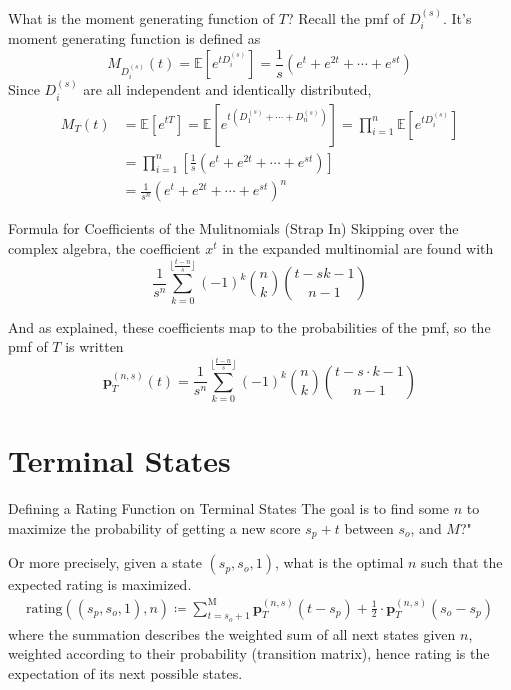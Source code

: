 \documentclass{beamer}
\begin{document}
\begin{frame}{What is the moment generating function of $T$?}
    Recall the pmf of $D_{i}^{(s)}$. It's moment generating function is defined as
    $$
    M_{D_{i}^{(s)}}(t) = \mathbb{E}[e^{tD_{i}^{(s)}}] = \frac{1}{s}(e^{t} + e^{2t} + \cdots + e^{st})
    $$
    Since $D_{i}^{(s)}$ are all independent and identically distributed,
    \begin{align*}
        M_{T}(t) &= \mathbb{E}[e^{tT}] = \mathbb{E}[e^{t(D_{1}^{(s)} + \cdots + D_{n}^{(s)})}] = \prod_{i = 1}^{n} \mathbb{E}[e^{tD_{i}^{(s)}}] \\
        &= \prod_{i = 1}^{n} \left[\frac{1}{s}(e^{t} + e^{2t} + \cdots + e^{st}) \right] \\
        &= \frac{1}{s^n} (e^{t} + e^{2t} + \cdots + e^{st})^n
    \end{align*}
\end{frame}


\begin{frame}{Formula for Coefficients of the Mulitnomials (Strap In)}
    Skipping over the complex algebra, the coefficient $x^t$ in the expanded multinomial are found with
    $$
    \frac{1}{s^n} \sum_{k = 0}^{\lfloor\frac{t-n}{s} \rfloor} (-1)^k \binom{n}{k} \binom{t-sk-1}{n-1}
    $$ 

    And as explained, these coefficients map to the probabilities of the pmf, so the pmf of $T$ is written
    $$
    \textbf{p}_{T}^{(n, s)}(t) = \frac{1}{s^n} \sum_{k = 0}^{\lfloor\frac{t-n}{s} \rfloor} (-1)^k \binom{n}{k} \binom{t - s \cdot k - 1}{n-1}
    $$
\end{frame}

\section{Terminal States}

\begin{frame}{Defining a Rating Function on Terminal States}
    The goal is to find some $n$ to maximize the probability of getting a new score $s_p + t$ between $s_o$, and $M$?" 
    
    Or more precisely, given a state $(s_p, s_o, 1)$, what is the optimal $n$ such that the expected rating is maximized.  
    \begin{align*}
        \text{rating}((s_p, s_o, 1), n) \coloneqq \sum_{t = s_o+1}^{\text{M}} \textbf{p}_{T}^{(n, s)}(t - s_p) + \frac{1}{2} \cdot \textbf{p}_{T}^{(n, s)}(s_o - s_p)
    \end{align*}
    where the summation describes the weighted sum of all next states given $n$, weighted according to their probability (transition matrix), hence rating is the expectation of its next possible states. 
\end{frame}
\end{document}
